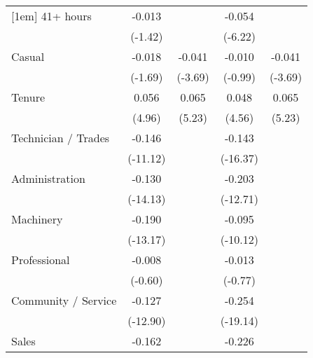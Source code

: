 {\begin{tabular}{l*{4}{c}}
[1em]
41+ hours           &      -0.013         &                     &      -0.054\sym{***}&                     \\
                    &     (-1.42)         &                     &     (-6.22)         &                     \\
[1em]
Casual              &      -0.018         &      -0.041\sym{***}&      -0.010         &      -0.041\sym{***}\\
                    &     (-1.69)         &     (-3.69)         &     (-0.99)         &     (-3.69)         \\
[1em]
Tenure              &       0.056\sym{***}&       0.065\sym{***}&       0.048\sym{***}&       0.065\sym{***}\\
                    &      (4.96)         &      (5.23)         &      (4.56)         &      (5.23)         \\
[1em]
Technician / Trades &      -0.146\sym{***}&                     &      -0.143\sym{***}&                     \\
                    &    (-11.12)         &                     &    (-16.37)         &                     \\
[1em]
Administration      &      -0.130\sym{***}&                     &      -0.203\sym{***}&                     \\
                    &    (-14.13)         &                     &    (-12.71)         &                     \\
[1em]
Machinery           &      -0.190\sym{***}&                     &      -0.095\sym{***}&                     \\
                    &    (-13.17)         &                     &    (-10.12)         &                     \\
[1em]
Professional        &      -0.008         &                     &      -0.013         &                     \\
                    &     (-0.60)         &                     &     (-0.77)         &                     \\
[1em]
Community / Service &      -0.127\sym{***}&                     &      -0.254\sym{***}&                     \\
                    &    (-12.90)         &                     &    (-19.14)         &                     \\
[1em]
Sales               &      -0.162\sym{***}&                     &      -0.226\sym{***}&                     \\

\end{tabular}}
